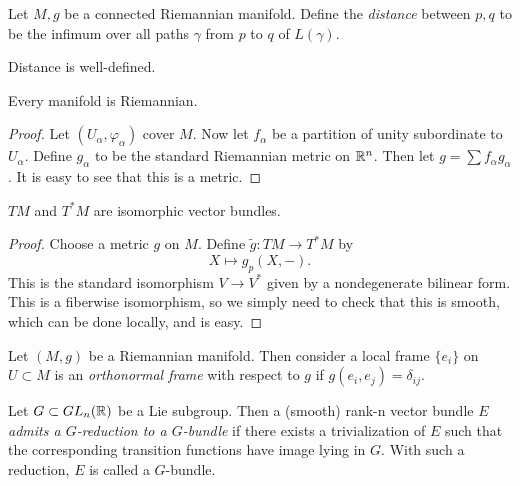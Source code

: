 \documentclass[twoside, 10pt]{article}
\begin{document}
    \begin{defn} Let $M,g$ be a connected Riemannian manifold. Define the
    \textit{distance} between $p,q$ to be the infimum over all paths $\gamma$
from $p$ to $q$ of $L(\gamma)$.  \end{defn}

    \begin{prop} Distance is well-defined.  \end{prop}

    \begin{prop} Every manifold is Riemannian.  \end{prop}

    \begin{proof} Let $(U_{\alpha},\varphi_{\alpha})$ cover $M$. Now let
        $f_{\alpha}$ be a partition of unity subordinate to $U_{\alpha}$.
        Define $g_{\alpha}$ to be the standard Riemannian metric on $\mathbb{R}^n$.
        Then let $g = \sum f_{\alpha}g_{\alpha}$. It is easy to see that this
        is a metric.  \end{proof}

    \begin{thm} $TM$ and $T^*M$ are isomorphic vector bundles.  \end{thm}

    \begin{proof} Choose a metric $g$ on $M$. Define $\widetilde{g}:TM \to
        T^*M$ by \[ X \mapsto g_p(X,-).\] This is the standard isomorphism $V
        \to V^*$ given by a nondegenerate bilinear form. This is a fiberwise
        isomorphism, so we simply need to check that this is smooth, which can
        be done locally, and is easy.  \end{proof}

    \begin{defn} Let $(M,g)$ be a Riemannian manifold. Then consider a local
    frame $\{e_i\}$ on $U \subset M$ is an \textit{orthonormal frame} with
respect to $g$ if $g(e_i,e_j) = \delta_{ij}$.  \end{defn}

    \begin{defn} Let $G \subset GL_n(\mathbb{R})$ be a Lie subgroup. Then a (smooth)
        rank-n vector bundle $E$ \textit{admits a $G$-reduction to a
        $G$-bundle} if there exists a trivialization of $E$ such that the
        corresponding transition functions have image lying in $G$. With such a
        reduction, $E$ is called a $G$-bundle.  \end{defn}
\end{document}
